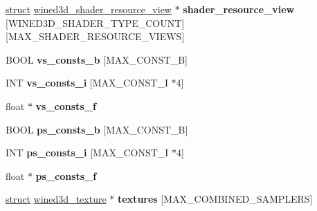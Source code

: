 \begin{DoxyCompactItemize}
\item 
\mbox{\label{structwined3d__state_af82d59f409a04019a01d95296a0f7fd0}} 
\hyperlink{interfacestruct}{struct} \hyperlink{structwined3d__shader__resource__view}{wined3d\+\_\+shader\+\_\+resource\+\_\+view} $\ast$ {\bfseries shader\+\_\+resource\+\_\+view} \mbox{[}W\+I\+N\+E\+D3\+D\+\_\+\+S\+H\+A\+D\+E\+R\+\_\+\+T\+Y\+P\+E\+\_\+\+C\+O\+U\+NT\mbox{]}\mbox{[}M\+A\+X\+\_\+\+S\+H\+A\+D\+E\+R\+\_\+\+R\+E\+S\+O\+U\+R\+C\+E\+\_\+\+V\+I\+E\+WS\mbox{]}
\item 
\mbox{\label{structwined3d__state_a1163549d4e46aa29351b8d33cbe26dc8}} 
B\+O\+OL {\bfseries vs\+\_\+consts\+\_\+b} \mbox{[}M\+A\+X\+\_\+\+C\+O\+N\+S\+T\+\_\+B\mbox{]}
\item 
\mbox{\label{structwined3d__state_af91f917d5c09278df31da025819f6f67}} 
I\+NT {\bfseries vs\+\_\+consts\+\_\+i} \mbox{[}M\+A\+X\+\_\+\+C\+O\+N\+S\+T\+\_\+I $\ast$4\mbox{]}
\item 
\mbox{\label{structwined3d__state_aa9e89bd301909b82387dd1c8b1dde70f}} 
float $\ast$ {\bfseries vs\+\_\+consts\+\_\+f}
\item 
\mbox{\label{structwined3d__state_af1fefc9b3a55711a4b9d9a170c31e9b0}} 
B\+O\+OL {\bfseries ps\+\_\+consts\+\_\+b} \mbox{[}M\+A\+X\+\_\+\+C\+O\+N\+S\+T\+\_\+B\mbox{]}
\item 
\mbox{\label{structwined3d__state_adf60b812dfe386b3a020bc7b0e721b77}} 
I\+NT {\bfseries ps\+\_\+consts\+\_\+i} \mbox{[}M\+A\+X\+\_\+\+C\+O\+N\+S\+T\+\_\+I $\ast$4\mbox{]}
\item 
\mbox{\label{structwined3d__state_a83444e98d750319ba20fc78e79b465bc}} 
float $\ast$ {\bfseries ps\+\_\+consts\+\_\+f}
\item 
\mbox{\label{structwined3d__state_a967af7b1b202012c2437943971bbf510}} 
\hyperlink{interfacestruct}{struct} \hyperlink{structwined3d__texture}{wined3d\+\_\+texture} $\ast$ {\bfseries textures} \mbox{[}M\+A\+X\+\_\+\+C\+O\+M\+B\+I\+N\+E\+D\+\_\+\+S\+A\+M\+P\+L\+E\+RS\mbox{]}
\item 
\mbox{\label{structwined3d__state_af66dd654bcc04627449ddbaf525ceb12}} 

\end{DoxyCompactItemize}
